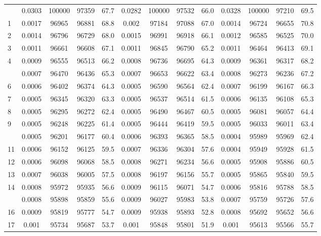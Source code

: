 \documentclass[
  14pt,
]{article}
\begin{document}
\begin{longtable}[t]{lcccccccccccc}
\endfoot
\bottomrule
\endlastfoot
0 & 0.0303 & 100000 & 97359 & 67.7 & 0.0282 & 100000 & 97532 & 66.0 & 0.0328 & 100000 & 97210 & 69.5\\
1 & 0.0017 & 96965 & 96881 & 68.8 & 0.002 & 97184 & 97088 & 67.0 & 0.0014 & 96724 & 96655 & 70.8\\
2 & 0.0014 & 96796 & 96729 & 68.0 & 0.0015 & 96991 & 96918 & 66.1 & 0.0012 & 96585 & 96525 & 70.0\\
3 & 0.0011 & 96661 & 96608 & 67.1 & 0.0011 & 96845 & 96790 & 65.2 & 0.0011 & 96464 & 96413 & 69.1\\
4 & 0.0009 & 96555 & 96513 & 66.2 & 0.0008 & 96736 & 96695 & 64.3 & 0.0009 & 96361 & 96317 & 68.2\\
\addlinespace
5 & 0.0007 & 96470 & 96436 & 65.3 & 0.0007 & 96653 & 96622 & 63.4 & 0.0008 & 96273 & 96236 & 67.2\\
6 & 0.0006 & 96402 & 96374 & 64.3 & 0.0005 & 96590 & 96564 & 62.4 & 0.0007 & 96199 & 96167 & 66.3\\
7 & 0.0005 & 96345 & 96320 & 63.3 & 0.0005 & 96537 & 96514 & 61.5 & 0.0006 & 96135 & 96108 & 65.3\\
8 & 0.0005 & 96295 & 96272 & 62.4 & 0.0005 & 96490 & 96467 & 60.5 & 0.0005 & 96081 & 96057 & 64.4\\
9 & 0.0005 & 96248 & 96225 & 61.4 & 0.0005 & 96444 & 96419 & 59.5 & 0.0005 & 96033 & 96011 & 63.4\\
\addlinespace
10 & 0.0005 & 96201 & 96177 & 60.4 & 0.0006 & 96393 & 96365 & 58.5 & 0.0004 & 95989 & 95969 & 62.4\\
11 & 0.0006 & 96152 & 96125 & 59.5 & 0.0007 & 96336 & 96304 & 57.6 & 0.0004 & 95949 & 95928 & 61.5\\
12 & 0.0006 & 96098 & 96068 & 58.5 & 0.0008 & 96271 & 96234 & 56.6 & 0.0005 & 95908 & 95886 & 60.5\\
13 & 0.0007 & 96038 & 96005 & 57.5 & 0.0008 & 96197 & 96156 & 55.7 & 0.0005 & 95865 & 95840 & 59.5\\
14 & 0.0008 & 95972 & 95935 & 56.6 & 0.0009 & 96115 & 96071 & 54.7 & 0.0006 & 95816 & 95788 & 58.5\\
\addlinespace
15 & 0.0008 & 95898 & 95859 & 55.6 & 0.0009 & 96027 & 95983 & 53.8 & 0.0007 & 95759 & 95726 & 57.6\\
16 & 0.0009 & 95819 & 95777 & 54.7 & 0.0009 & 95938 & 95893 & 52.8 & 0.0008 & 95692 & 95652 & 56.6\\
17 & 0.001 & 95734 & 95687 & 53.7 & 0.001 & 95848 & 95801 & 51.9 & 0.001 & 95613 & 95566 & 55.7\\

\end{longtable}
\end{document}
